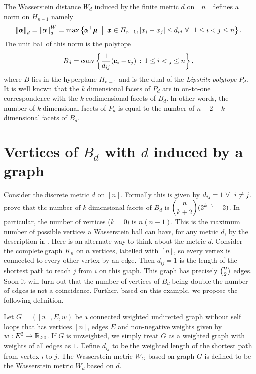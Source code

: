 The Wasserstein distance $W_d$ induced  by the finite metric $d$ on $[n]$ defines a 
norm on $H_{n-1}$ namely $$\norm{\pmb\alpha}d = \norm{\pmb\alpha}d^{W} = \max\set{\pmb \alpha^{\top}\pmb\mu \st \pmb x\in H_{n-1}, \abs{x_{i}-x_{j}}\le d_{ij}\fa~1\le i<j\le n}.$$ The unit ball of this norm is the polytope
\begin{equation}\label{eq:conv}B_{d} = \mathrm{conv} \left\{ \frac{1}{d_{ij}}(\pmb e_i - \pmb e_j) \, : \, 1 \leq i < j \leq n \right\},\end{equation}
where $B$ lies in the hyperplane $H_{n-1}$ and is the dual of the {\it Lipshitz polytope} $P_{d}$. It is well known that the $k$ dimensional facets of $P_{d}$ are in on-to-one correspondence with the $k$ codimensional facets of $B_{d}$. In other words, the number of $k$ dimensional facets of $P_{d}$ is equal to the number of $n-2-k$ dimensional facets of $B_{d}$.

\section{Vertices of $B_{d}$ with $d$ induced by a graph}

Consider the discrete metric $d$ on $[n]$. Formally this is given by $d_{ij} = 1~\forall~~i\ne j$. \cite{rootpoly, ccelik2021wasserstein} prove that the number of $k$ dimensional facets of $B_{d}$ is $\displaystyle{n\choose k+2}(2^{k+2}-2)$. In particular, the number of vertices ($k=0$) is $n(n-1)$. This is the maximum number of possible vertices a Wasserstein ball can have, for any metric $d$, by the description in . Here is an alternate way to think about the metric $d$. Consider the complete graph $K_{n}$ on $n$ vertices, labelled with $[n]$, so every vertex is connected to every other vertex by an edge. Then $d_{ij}=1$ is the length of the shortest path to reach $j$ from $i$ on this graph. This graph has precisely $\displaystyle n\choose 2$ edges. Soon it will turn out that the number of vertices of $B_{d}$ being double the number of edges is not a coincidence. Further, based on this example, we propose the following definition.

\begin{defn}
Let $G = ([n],E,w)$ be a connected weighted undirected graph without self loops that has vertices $[n]$, edges $E$ and non-negative weights given by $w:E^{2}\to\mathbb{R}_{\ge 0}$. If $G$ is unweighted, we simply treat $G$ as a weighted graph with weights of all edges as $1$. Define $d_{ij}$ to be the weighted length of the shortest path from vertex $i$ to $j$. The \textup{Wasserstein metric} $W_{G}$ \textup{based on graph} $G$ is defined to be the Wasserstein metric $W_{d}$ based on $d$. 
\end{defn}

